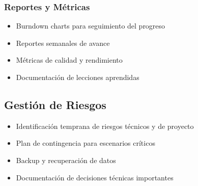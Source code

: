 \subsubsection{Reportes y Métricas}
\begin{itemize}
    \item Burndown charts para seguimiento del progreso
    \item Reportes semanales de avance
    \item Métricas de calidad y rendimiento
    \item Documentación de lecciones aprendidas
\end{itemize}

\subsection{Gestión de Riesgos}

\begin{itemize}
    \item Identificación temprana de riesgos técnicos y de proyecto
    \item Plan de contingencia para escenarios críticos
    \item Backup y recuperación de datos
    \item Documentación de decisiones técnicas importantes
\end{itemize}